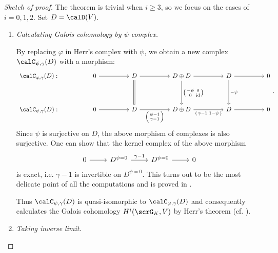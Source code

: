 \documentclass[a4paper,oneside]{amsart}
\let\opn\operatorname
\newcommand{\id}{\opn{id}}
\numberwithin{equation}{section}
\begin{document}
\begin{proof}[Sketch of proof]\leavevmode
    The theorem is trivial when $i\geq 3$, so we focus on the cases of $i=0,1,2$. Set $D=\calD(V)$.
    \begin{enumerate}[label=\textit{Step \arabic*.},wide, labelwidth=!, labelindent=0pt]
        \item \textit{Calculating Galois cohomology by $\psi$-complex.}

              By replacing $\varphi$ in Herr's complex with $\psi$, we obtain a new complex $\calC_{\psi,\gamma}(D)$ with a morphism:
              $$\begin{tikzcd}[sep=huge, ampersand replacement=\&]
                      \calC_{\varphi,\gamma}(D):\&0\ar[r]\&D\ar[r]\ar[d,equal]\&D\oplus D\ar[r]\ar[d,"{\begin{psmallmatrix}
                          -\psi & 0\\0&\id
                      \end{psmallmatrix}}"]\& D\ar[r]\ar[d,"-\psi"]\&0\\
                      \calC_{\psi,\gamma}(D):\&0\ar[r]\&D\ar[r,"\begin{psmallmatrix}
                              \psi-1 \\\gamma-1
                          \end{psmallmatrix}"']\&D\oplus D\ar[r,"{\begin{psmallmatrix}
                          \gamma-1 & 1-\psi
                      \end{psmallmatrix}}"']\& D\ar[r]\&0
                  \end{tikzcd}.$$
              Since $\psi$ is surjective on $D$, the above morphism of complexes is also surjective.
              One can show that the kernel complex of the above morphism
              $$\begin{tikzcd}
                      0\ar[r]&D^{\psi=0}\ar[r,"\gamma-1"]&D^{\psi=0}\ar[r]&0
                  \end{tikzcd}$$
              is exact, i.e. $\gamma-1$ is invertible on $D^{\psi=0}$. This turns out to be the most delicate point of all the computations and is proved in \cite[Th\'eor\`eme 3.8]{herr_sur_1998}.

              Thus $\calC_{\psi,\gamma}(D)$ is quasi-isomorphic to $\calC_{\varphi,\gamma}(D)$ and consequently calculates the Galois cohomology $H^i(\scrG_K,V)$ by Herr's theorem (cf. ).
        \item \textit{Taking inverse limit.}


\end{enumerate}
\end{proof}
\end{document}
